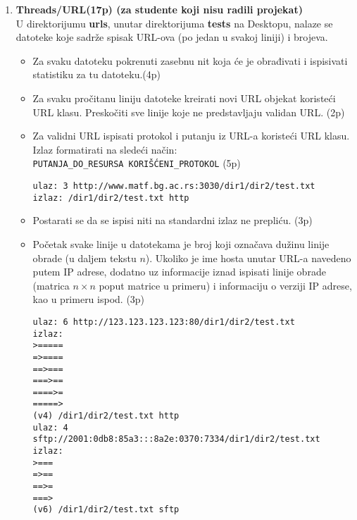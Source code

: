 \documentclass[]{article}
\begin{document}
\begin{enumerate}

\item \textbf{Threads/URL(17p) (za studente koji nisu radili projekat)}
\\U direktorijumu \textbf{urls}, unutar direktorijuma \textbf{tests} na Desktopu, nalaze se datoteke koje sadrže spisak URL-ova (po jedan u svakoj liniji) i brojeva.
\begin{itemize}
  \item Za svaku datoteku pokrenuti zasebnu nit koja će je obrađivati i ispisivati statistiku za tu datoteku.\hfill (4p)
  \item Za svaku pročitanu liniju datoteke kreirati novi URL objekat koristeći URL klasu. Preskočiti sve linije koje ne predstavljaju validan URL. \hfill (2p)
  \item Za validni URL ispisati protokol i putanju iz URL-a koristeći URL klasu. Izlaz formatirati na sledeći način:\\
  \texttt{PUTANJA\_DO\_RESURSA KORIŠĆENI\_PROTOKOL}
  \hfill (5p)

\noindent
\begin{lstlisting}  
ulaz: 3 http://www.matf.bg.ac.rs:3030/dir1/dir2/test.txt
izlaz: /dir1/dir2/test.txt http 
\end{lstlisting}

\item Postarati se da se ispisi niti na standardni izlaz ne prepliću. \hfill (3p)

\item Početak svake linije u datotekama je broj koji označava dužinu linije obrade (u daljem tekstu $n$). Ukoliko je ime hosta unutar URL-a navedeno putem IP adrese, dodatno uz informacije iznad ispisati linije obrade (matrica $n \times n$ poput matrice u primeru) i informaciju o verziji IP adrese, kao u primeru ispod. \hfill (3p)

\noindent
\begin{lstlisting}
ulaz: 6 http://123.123.123.123:80/dir1/dir2/test.txt
izlaz: 
>=====
=>====
==>===
===>==
====>=
=====>
(v4) /dir1/dir2/test.txt http  
ulaz: 4 sftp://2001:0db8:85a3:::8a2e:0370:7334/dir1/dir2/test.txt
izlaz:
>===
=>==
==>=
===>
(v6) /dir1/dir2/test.txt sftp 
\end{lstlisting}
\end{itemize}


\end{enumerate}
\end{document}
